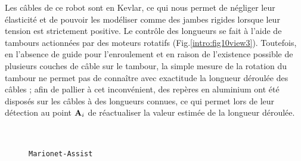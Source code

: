 Les câbles de ce robot sont en Kevlar, ce qui nous permet de négliger leur élasticité et de 
pouvoir les modéliser comme des jambes rigides lorsque leur tension est 
strictement positive. Le contrôle des longueurs se fait à l'aide de tambours 
actionnées par des moteurs rotatifs (Fig.\ref{intro:fig10view3}). Toutefois, en 
l'absence de guide pour l'enroulement et en raison de l'existence possible de plusieurs couches de câble sur le tambour, la simple mesure de la rotation du tambour ne permet pas de connaître avec exactitude la longueur déroulée des câbles ; afin de pallier à cet inconvénient, des rep\`eres en 
aluminium ont été disposés sur les câbles à des longueurs connues, ce qui 
permet lors de leur détection au point ${\bf A}_i$ de réactualiser la valeur 
estimée de la longueur déroulée.

\begin{figure}[htp]
  \centering
 \hfill
\\
\hfill
    \caption{\footnotesize{{\tt Marionet-Assist}}}
\label{intro:fig10}
\end{figure}

